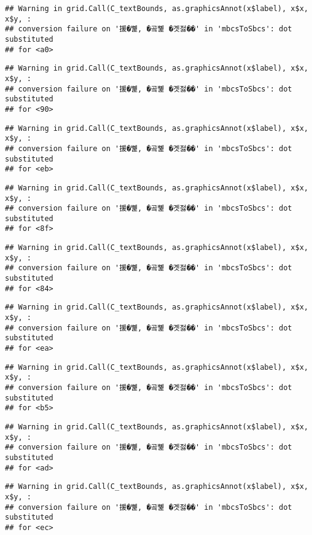 \documentclass[
]{article}
\begin{document}
\begin{verbatim}
## Warning in grid.Call(C_textBounds, as.graphicsAnnot(x$label), x$x, x$y, :
## conversion failure on '援�뼱, �곸뼱 �곗젏��' in 'mbcsToSbcs': dot substituted
## for <a0>
\end{verbatim}

\begin{verbatim}
## Warning in grid.Call(C_textBounds, as.graphicsAnnot(x$label), x$x, x$y, :
## conversion failure on '援�뼱, �곸뼱 �곗젏��' in 'mbcsToSbcs': dot substituted
## for <90>
\end{verbatim}

\begin{verbatim}
## Warning in grid.Call(C_textBounds, as.graphicsAnnot(x$label), x$x, x$y, :
## conversion failure on '援�뼱, �곸뼱 �곗젏��' in 'mbcsToSbcs': dot substituted
## for <eb>
\end{verbatim}

\begin{verbatim}
## Warning in grid.Call(C_textBounds, as.graphicsAnnot(x$label), x$x, x$y, :
## conversion failure on '援�뼱, �곸뼱 �곗젏��' in 'mbcsToSbcs': dot substituted
## for <8f>
\end{verbatim}

\begin{verbatim}
## Warning in grid.Call(C_textBounds, as.graphicsAnnot(x$label), x$x, x$y, :
## conversion failure on '援�뼱, �곸뼱 �곗젏��' in 'mbcsToSbcs': dot substituted
## for <84>
\end{verbatim}

\begin{verbatim}
## Warning in grid.Call(C_textBounds, as.graphicsAnnot(x$label), x$x, x$y, :
## conversion failure on '援�뼱, �곸뼱 �곗젏��' in 'mbcsToSbcs': dot substituted
## for <ea>
\end{verbatim}

\begin{verbatim}
## Warning in grid.Call(C_textBounds, as.graphicsAnnot(x$label), x$x, x$y, :
## conversion failure on '援�뼱, �곸뼱 �곗젏��' in 'mbcsToSbcs': dot substituted
## for <b5>
\end{verbatim}

\begin{verbatim}
## Warning in grid.Call(C_textBounds, as.graphicsAnnot(x$label), x$x, x$y, :
## conversion failure on '援�뼱, �곸뼱 �곗젏��' in 'mbcsToSbcs': dot substituted
## for <ad>
\end{verbatim}

\begin{verbatim}
## Warning in grid.Call(C_textBounds, as.graphicsAnnot(x$label), x$x, x$y, :
## conversion failure on '援�뼱, �곸뼱 �곗젏��' in 'mbcsToSbcs': dot substituted
## for <ec>
\end{verbatim}
\end{document}
